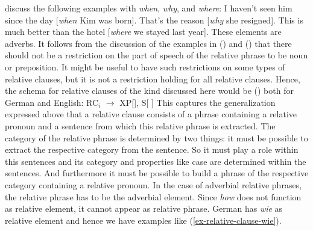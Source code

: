 \citet[]{HPP2002a-u} discuss the following examples with \emph{when}, \emph{why}, and \emph{where}:
\eal
\ex I haven't seen him since the day [\emph{when} Kim was born].
\ex That's the reason [\emph{why} she resigned].
\ex This is much better than the hotel [\emph{where} we stayed last year].
\zl
These elements are adverbs. It follows from the discussion of the examples in () and
() that there should not be a restriction on the part of speech of the relative phrase to be
noun or preposition. It might be useful to have such restrictions on some types of relative clauses,
but it is not a restriction holding for all relative clauses. Hence, the schema for relative clauses
of the kind discussed here would be () both for German and English:
\ea
RC$_i$ $\to$ XP[\rel {}], S[\slasch {} ]
\z
This captures the generalization expressed above that a relative clause consists of a phrase
containing a relative pronoun and a sentence from which this relative phrase is extracted. The
category of the relative phrase is determined by two things: it must be possible to extract the
respective category from the sentence. So it must play a role within this sentences and its category
and properties like case are determined within the sentences. And furthermore it must be possible to
build a phrase of the respective category containing a relative pronoun. In the case of adverbial
relative phrases, the relative phrase has to be the adverbial element. Since \emph{how} does not
function as relative element, it cannot appear as relative phrase. German has \emph{wie} as relative
element and hence we have examples like (\ref{ex-relative-clause-wie}). 


\bigskip
{}


